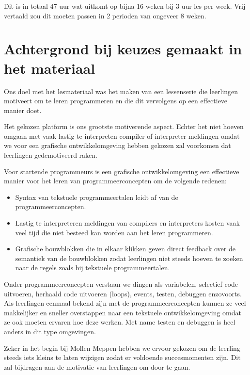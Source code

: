 \documentclass{BYUTextbook}
\begin{document}
Dit is in totaal 47 uur wat uitkomt op bijna 16 weken bij 3 uur les per week. Vrij vertaald zou dit moeten passen in 2 perioden van ongeveer 8 weken.

\chapter{Achtergrond bij keuzes gemaakt in het materiaal}
Ons doel met het lesmateriaal was het maken van een lessenserie die leerlingen motiveert om te leren programmeren en die dit vervolgens op een effectieve manier doet.

Het gekozen platform is ons grootste motiverende aspect. Echter het niet hoeven omgaan met vaak lastig te interpreten compiler of interpreter meldingen omdat we voor een grafische ontwikkelomgeving hebben gekozen zal voorkomen dat leerlingen gedemotiveerd raken.

Voor startende programmeurs is een grafische ontwikkelomgeving een effectieve manier voor het leren van programmeerconcepten om de volgende redenen:
\begin{itemize}
  \item Syntax van tekstuele programmeertalen leidt af van de programmeerconcepten.
  \item Lastig te interpreteren meldingen van compilers en interpreters kosten vaak veel tijd die niet besteed kan worden aan het leren programmeren.
  \item Grafische bouwblokken die in elkaar klikken geven direct feedback over de semantiek van de bouwblokken zodat leerlingen niet steeds hoeven te zoeken naar de regels zoals bij tekstuele programmeertalen.
\end{itemize}

Onder programmeerconcepten verstaan we dingen als variabelen, selectief code uitvoeren, herhaald code uitvoeren (loops), events, testen, debuggen enzovoorts. Als leerlingen eenmaal bekend zijn met de programmeerconcepten kunnen ze veel makkelijker en sneller overstappen naar een tekstuele ontwikkelomgeving omdat ze ook moeten ervaren hoe deze werken. Met name testen en debuggen is heel anders in dit type omgevingen.

Zeker in het begin bij Mollen Meppen hebben we ervoor gekozen om de leerling steeds iets kleins te laten wijzigen zodat er voldoende succesmomenten zijn. Dit zal bijdragen aan de motivatie van leerlingen om door te gaan.
\end{document}
